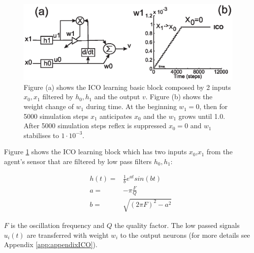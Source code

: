 \begin{figure}[htbp]
\begin{center}
\includegraphics[scale=0.5]{figures/socialadapt/ico.eps}
\caption[Agent learns with the ICO learning]{Figure (a) shows the ICO learning basic
block composed by 2 inputs $x_{0},x_{1}$ filtered by $h_{0},h_{1}$ and the output $v$.
Figure (b) shows the weight change of $w_{1}$ during time. At the beginning $w_{1}=0$,
then for 5000 simulation steps $x_{1}$ anticipates $x_{0}$ and the $w_{1}$ grows until 1.0.
After 5000 simulation steps reflex is suppressed $x_{0}=0$ and $w_{1}$ stabilises to $1 \cdot 10^{-3}$.
\label{fig:ico}}
\end{center}
\end{figure}

Figure \ref{fig:ico} shows the ICO learning block which has two inputs $x_{0}$,$x_{1}$
from the agent's sensor that are filtered by low pass filters $h_{0},h_{1}$:

\setlength{\arraycolsep}{0.0em}
\begin{eqnarray}
&h(t)=&\frac{1}{b}e^{at}sin(bt) \label{eq:1}\\
&a   =&-\pi \frac{F}{Q} \label{eq:F}\\
&b   =&\sqrt{(2\pi F)^2 -a^{2}} \label{eq:Q}
\end{eqnarray}
\setlength{\arraycolsep}{5pt}

$F$ is the oscillation frequency and $Q$ the quality factor. The low passed
signals $u_{i}(t)$ are transferred with weight $w_{i}$ to the output
neurons (for more details see Appendix \ref{app:appendixICO}).

